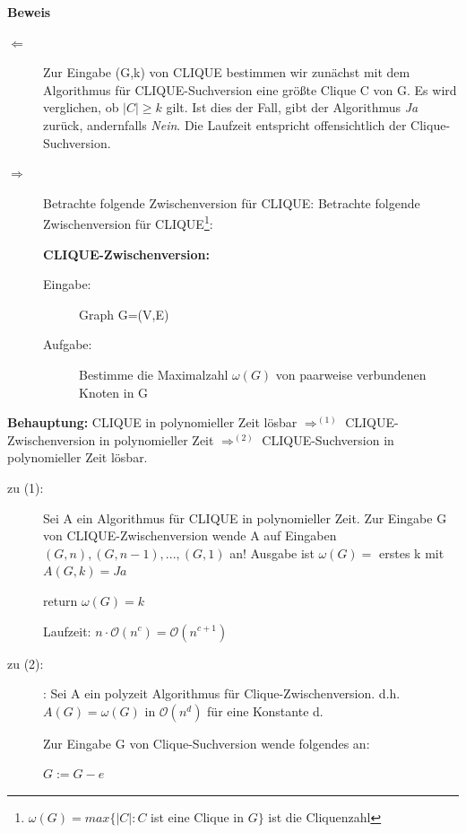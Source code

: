 \documentclass{article} %
\begin{document}
\textbf{Beweis}
\begin{description}
\item[$\Leftarrow$] Zur Eingabe (G,k) von CLIQUE  bestimmen wir zunächst mit dem Algorithmus für CLIQUE-Suchversion eine größte Clique C von G.
Es wird verglichen, ob $|C| \geq k$ gilt.
Ist dies der Fall, gibt der Algorithmus \emph{Ja} zurück, andernfalls \emph{Nein}.
Die Laufzeit entspricht offensichtlich der Clique-Suchversion.

\item[$\Rightarrow$] Betrachte folgende Zwischenversion für CLIQUE:
Betrachte folgende Zwischenversion für CLIQUE\footnote{$\omega(G) = max \{|C|: C$ ist eine Clique in $G\}$ ist die Cliquenzahl}:
\begin{framed}
\textbf{CLIQUE-Zwischenversion:}
\begin{description}
\item  [Eingabe:]Graph G=(V,E)
\item [Aufgabe:] Bestimme die Maximalzahl $\omega (G)$  von paarweise verbundenen Knoten in G
\end{description}
\end{framed}
\end{description}
\textbf{Behauptung:} CLIQUE in polynomieller Zeit lösbar $\Rightarrow^{(1)}$ CLIQUE-Zwischenversion in polynomieller Zeit $\Rightarrow^{(2)}$ CLIQUE-Suchversion in polynomieller Zeit lösbar.

\begin{description}
\item[zu (1):] Sei A ein Algorithmus für CLIQUE in polynomieller Zeit.
Zur Eingabe G von CLIQUE-Zwischenversion wende A auf Eingaben $(G,n), (G,n-1),...,(G,1)$ an!
Ausgabe ist $\omega (G) =$ erstes k mit $A(G,k) = Ja$

\begin{algorithmic}[1]
		return $\omega (G) = k $
	\EndIf
\EndFor
\end{algorithmic}
Laufzeit: $n \cdot \mathcal{O}(n^c) = \mathcal{O}(n^{c+1})$


\item[zu (2):]: Sei A ein polyzeit Algorithmus für Clique-Zwischenversion.
d.h. $A(G) = \omega (G)$ in $\mathcal{O}(n^d)$ für eine Konstante d.

Zur Eingabe G von Clique-Suchversion wende folgendes an:
\begin{algorithmic}[1]
	 $G := G - e$
	\EndIf
\EndFor
\State {}
\end{algorithmic}
\end{description}
\end{document}
